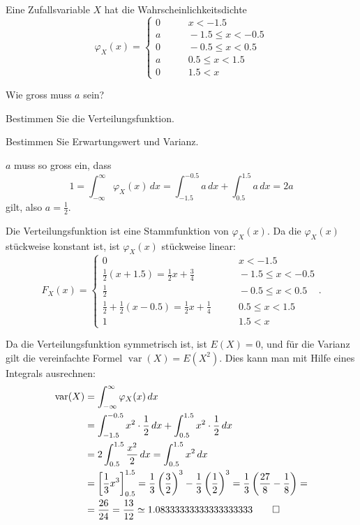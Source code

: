 Eine Zufallsvariable $X$ hat die Wahrscheinlichkeitsdichte
\[
\varphi_X(x)=\begin{cases}
0&\qquad x <-1.5\\
a&\qquad -1.5\le x<-0.5\\
0&\qquad -0.5\le x<0.5\\
a&\qquad 0.5\le x<1.5\\
0&\qquad 1.5<x
\end{cases}
\]
\begin{teilaufgaben}
\item Wie gross muss $a$ sein?
\item Bestimmen Sie die Verteilungsfunktion.
\item Bestimmen Sie Erwartungswert und Varianz.
\end{teilaufgaben}


\begin{loesung}
\begin{teilaufgaben}
\item $a$ muss so gross ein, dass
\[
1=\int_{-\infty}^\infty \varphi_X(x)\,dx=
\int_{-1.5}^{-0.5}a\,dx+\int_{0.5}^{1.5}a\,dx=2a
\]
gilt, also $a=\frac12$.
\item Die Verteilungsfunktion ist eine Stammfunktion von $\varphi_X(x)$.
Da die $\varphi_X(x)$ stückweise konstant ist, ist $\varphi_X(x)$
stückweise linear:
\[
F_X(x)=\begin{cases}
0&\qquad x <-1.5\\
\frac12(x+1.5)=\frac12x+\frac34&\qquad -1.5\le x<-0.5\\
\frac12&\qquad -0.5\le x<0.5\\
\frac12+\frac12(x-0.5)=\frac12x+\frac14&\qquad 0.5\le x<1.5\\
1&\qquad 1.5<x
\end{cases}.
\]
\item Da die Verteilungsfunktion symmetrisch ist, ist $E(X)=0$, und
für die Varianz gilt die vereinfachte Formel $\operatorname{var}(X)=E(X^2)$.
Dies kann man mit Hilfe eines Integrals ausrechnen:
\begin{align*}
\operatorname{var}(X)
&=\int_{-\infty}^\infty \varphi_X(x)\,dx\\
&=\int_{-1.5}^{-0.5}x^2\cdot\frac12\,dx+\int_{0.5}^{1.5} x^2\cdot \frac12\,dx\\
&=2\int_{0.5}^{1.5}\frac{x^2}2\,dx=\int_{0.5}^{1.5}x^2\,dx\\
&=\left[\frac13x^3\right]_{0.5}^{1.5}
 =\frac13\left(\frac32\right)^3-\frac13\left(\frac12\right)^3
=\frac13\left(\frac{27}8-\frac18\right)=
\\
&=\frac{26}{24}=\frac{13}{12}
\simeq 1.08333333333333333333
\qedhere
\end{align*}
\end{teilaufgaben}
\end{loesung}

